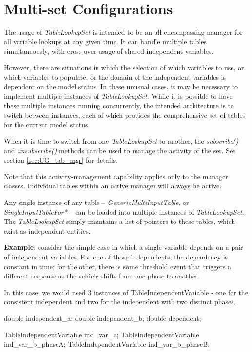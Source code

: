 \documentclass[11pt,fleqn]{report}
\begin{document}
\section {Multi-set Configurations}
The usage of \textit{TableLookupSet} is intended to be an all-encompassing
manager for all variable lookups at any given time.  It can handle multiple
tables simultaneously, with cross-over usage of shared independent variables.

However, there are situations in which the selection of which variables to use,
or which variables to populate, or the domain of the independent variables
is dependent on the model status.  In these unusual cases, it may be
necessary to implement multiple instances of \textit{TableLookupSet}.
While it is possible to have
these multiple instances running concurrently, the intended
architecture is to switch between instances, each of which provides the
comprehensive set of tables for the current model status.

When it is time to switch from one \textit{TableLookupSet} to another, the
\textit{subscribe()} and \textit{unsubscribe()} methods can be used to
manage the activity of the set.  See section \ref{sec:UG_tab_mgr} for
details.

Note that this activity-management capability applies only to the
manager classes.  Individual tables within an active manager will always be
active.

Any single instance of any table -- \textit{GenericMultiInputTable}, or
\textit{SingleInputTableFor*} --
can be loaded into multiple instances of
\textit{TableLookupSet}.  The \textit{TableLookupSet} simply maintains a list
of pointers to these tables, which exist as independent entities.

\textbf{Example}: consider the simple case in which a single variable
 depends on a
pair of independent variables.  For one of those independents, the dependency
is constant in time; for the other, there is some threshold event that triggers
a different response as the vehicle shifts from one phase to another.

In this case, we would need 3 instances of TableIndependentVariable - one for
the consistent independent and two for the independent with two distinct
phases.
\begin{code}
double                     independent_a;
double                     independent_b;
double                     dependent;

TableIndependentVariable   ind_var_a;
TableIndependentVariable   ind_var_b_phaseA;
TableIndependentVariable   ind_var_b_phaseB;
\end{code}
\end{document}
